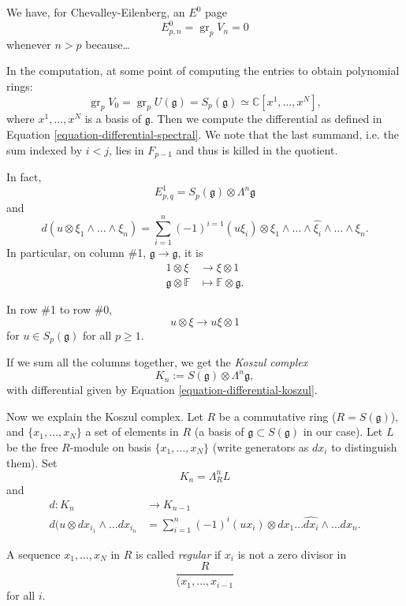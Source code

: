 We have, for Chevalley-Eilenberg,
an $E^0$ page
$$
E^0_{p,n}
=
\operatorname{gr}_pV_n = 0
$$
whenever $n>p$ because…

In the computation, at some point of
computing the entries to obtain polynomial
rings:
$$
\operatorname{gr}_pV_0
=
\operatorname{gr}_pU(\mathfrak{g})
=
S_p(\mathfrak{g})
\simeq
\mathbb{C}[x^1,\dots,x^N],
$$
where $x^1,\dots,x^N$ is a basis of
$\mathfrak{g}$.
Then we compute the differential
as defined in
Equation
\ref{equation-differential-spectral}.
We note that the last summand, i.e.
the sum indexed by $i<j$,
lies in $F_{p-1}$ and thus is killed in the
quotient.

In fact,
$$
E^1_{p,q}
=
S_p(\mathfrak{g})
\otimes \Lambda^n\mathfrak{g}
$$
and
$$
d(u \otimes \xi_1\wedge\dots\wedge \xi_n)
=
\sum_{i=1}^n(-1)^{i=1}
(u\xi_i) \otimes \xi_1 \wedge\dots\wedge
\widehat{\xi_i}\wedge\dots\wedge \xi_n.
$$
In particular, on column \#1,
$\mathfrak{g} \to \mathfrak{g}$, it is
\begin{equation}
\label{equation-differential-koszul}
\begin{aligned}
1 \otimes\xi &\longrightarrow \xi \otimes 1 \\
\mathfrak{g}\otimes\mathbb{F} &\longmapsto 
\mathbb{F}\otimes \mathfrak{g}.
\end{aligned}
\end{equation}

In row \#1 to row \#0,
$$
u \otimes \xi \to u\xi \otimes 1
$$
for $u \in S_p(\mathfrak{g})$ for all
$p \geq 1$.

If we sum all the columns together, we get
the {\it Koszul complex}
$$
K_n:= S(\mathfrak{g}) \otimes
\Lambda^n\mathfrak{g},
$$
with differential given by
Equation \ref{equation-differential-koszul}.

\medskip\noindent
Now we explain the Koszul complex.
Let $R$ be a commutative ring
($R = S(\mathfrak{g})$),
and $\{x_1,\dots,x_N\}$
a set of elements in $R$
(a basis of $\mathfrak{g} \subset
S(\mathfrak{g})$
in our case).
Let $L$ be the free $R$-module
on basis
$\{x_1,\dots,x_N\}$ 
(write generators as $dx_i$
to distinguish them).
Set
$$
K_n = \Lambda^n_R L
$$
and
$$
\begin{aligned}
d: K_n &\longrightarrow K_{n-1} \\
d(u \otimes dx_{i_1}
\wedge\dots dx_{i_n} &=
\sum_{i=1}^n
(-1)^i (ux_i)
\otimes dx_1 \dots
\widehat{dx_i}\wedge\dots dx_n.
\end{aligned}
$$
\begin{definition}
\label{definition-regular-sequence}
A sequence $x_1,\dots,x_N$
in $R$ is called {\it regular} 
if $x_i$ is not a zero divisor in
$$
\frac{R}{(x_1,\dots,x_{i-1}}
$$
for all $i$.
\end{definition}

